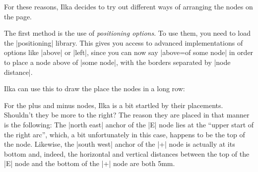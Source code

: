 For these reasons, Ilka decides to try out different ways of arranging the
nodes on the page.

The first method is the use of \emph{positioning options}. To use them, you
need to load the |positioning| library. This gives you access to advanced
implementations of options like |above| or |left|, since you can now say
|above=of some node| in order to place a node above of |some node|, with the
borders separated by |node distance|.

Ilka can use this to draw the place the nodes in a long row:
%
\begin{codeexample}
\end{codeexample}
%
\begin{codeexample}[preamble={\usetikzlibrary{positioning,shapes.misc}}]
\end{codeexample}

For the plus and minus nodes, Ilka is a bit startled by their placements.
Shouldn't they be more to the right? The reason they are placed in that manner
is the following: The |north east| anchor of the |E| node lies at the ``upper
start of the right arc'', which, a bit unfortunately in this case, happens to
be the top of the node. Likewise, the |south west| anchor of the |+| node is
actually at its bottom and, indeed, the horizontal and vertical distances
between the top of the |E| node and the bottom of the |+| node are both 5mm.

